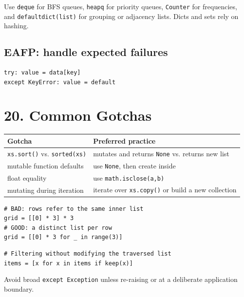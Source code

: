 \documentclass[10pt,a4paper]{article}
\newcommand{\py}[1]{\texttt{#1}}
\newenvironment{tbl}{\par\begin{lrbox}{\tblbox}\begin{minipage}{\linewidth}\compacttable}%
  {\end{minipage}\end{lrbox}\noindent\raisebox{\dp\tblbox}{\usebox{\tblbox}}\par}
\newcommand{\compacttable}{\fontsize{10}{11.2}\selectfont\setlength{\tabcolsep}{2.5pt}\renewcommand{\arraystretch}{1.08}}
\begin{document}
\begin{multicols}{2}
Use \py{deque} for BFS queues, \py{heapq} for priority queues, \py{Counter} for frequencies, and \py{defaultdict(list)} for grouping or adjacency lists. Dicts and sets rely on hashing.

\subsection{EAFP: handle expected failures}

\begin{lstlisting}
try: value = data[key]
except KeyError: value = default
\end{lstlisting}

\section{20. Common Gotchas}

\begin{tbl}
\begin{tabularx}{\linewidth}{@{}R{.39\linewidth}L@{}}
\toprule
\textbf{Gotcha} & \textbf{Preferred practice} \\
\midrule
\py{xs.sort()} vs. \py{sorted(xs)} & mutates and returns \py{None} vs. returns new list \\
mutable function defaults & use \py{None}, then create inside \\
float equality & use \py{math.isclose(a,b)} \\
mutating during iteration & iterate over \py{xs.copy()} or build a new collection \\
\bottomrule
\end{tabularx}
\end{tbl}

\begin{lstlisting}
# BAD: rows refer to the same inner list
grid = [[0] * 3] * 3
# GOOD: a distinct list per row
grid = [[0] * 3 for _ in range(3)]
\end{lstlisting}

\begin{lstlisting}
# Filtering without modifying the traversed list
items = [x for x in items if keep(x)]
\end{lstlisting}

Avoid broad \py{except Exception} unless re-raising or at a deliberate application boundary.

\end{multicols}
\end{document}

